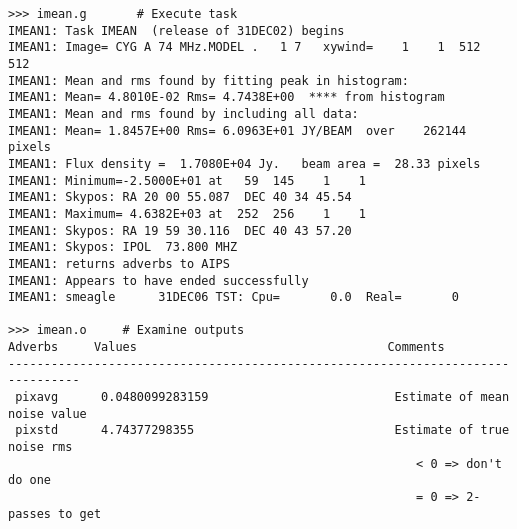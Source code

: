 \documentclass[11pt]{report}
\begin{document}
\begin{verbatim}
>>> imean.g       # Execute task
IMEAN1: Task IMEAN  (release of 31DEC02) begins
IMEAN1: Image= CYG A 74 MHz.MODEL .   1 7   xywind=    1    1  512  512
IMEAN1: Mean and rms found by fitting peak in histogram:
IMEAN1: Mean= 4.8010E-02 Rms= 4.7438E+00  **** from histogram
IMEAN1: Mean and rms found by including all data:
IMEAN1: Mean= 1.8457E+00 Rms= 6.0963E+01 JY/BEAM  over    262144 pixels
IMEAN1: Flux density =  1.7080E+04 Jy.   beam area =  28.33 pixels
IMEAN1: Minimum=-2.5000E+01 at   59  145    1    1
IMEAN1: Skypos: RA 20 00 55.087  DEC 40 34 45.54
IMEAN1: Maximum= 4.6382E+03 at  252  256    1    1
IMEAN1: Skypos: RA 19 59 30.116  DEC 40 43 57.20
IMEAN1: Skypos: IPOL  73.800 MHZ
IMEAN1: returns adverbs to AIPS
IMEAN1: Appears to have ended successfully
IMEAN1: smeagle      31DEC06 TST: Cpu=       0.0  Real=       0

>>> imean.o     # Examine outputs
Adverbs     Values                                   Comments
--------------------------------------------------------------------------------
 pixavg      0.0480099283159                          Estimate of mean noise value
 pixstd      4.74377298355                            Estimate of true noise rms
                                                         < 0 => don't do one
                                                         = 0 => 2-passes to get
\end{verbatim}
\end{document}
